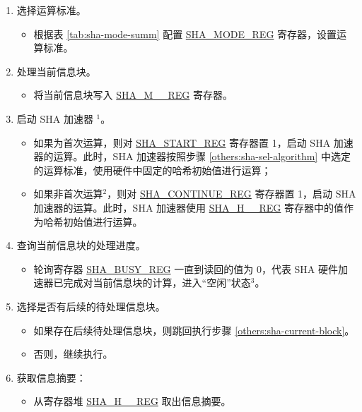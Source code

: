 \documentclass[main\_\_CN.tex]{subfiles}
\begin{document}
\begin{enumerate}
    \item \label{others:sha-sel-algorithm} 选择运算标准。
    \begin{itemize}
        \item 根据表 \ref{tab:sha-mode-summ} 配置 \hyperref[regdesc:SHAMODEREG]{SHA\_MODE\_REG} 寄存器，设置运算标准。
    \end{itemize}
    \item \label{others:sha-current-block} 处理当前信息块。
    \begin{itemize}
        \item 将当前信息块写入 \hyperref[regdesc:SHAMNREG]{SHA\_M\_\_REG} 寄存器。
    \end{itemize}
    \item 启动 SHA 加速器 \hyperref[others:sha-note-typical-sha]{$^1$}。
            \begin{itemize}
                \item 如果为首次运算，则对 \hyperref[regdesc:SHASTARTREG]{SHA\_START\_REG} 寄存器置 1，启动 SHA 加速器的运算。此时，SHA 加速器按照步骤 \ref{others:sha-sel-algorithm} 中选定的运算标准，使用硬件中固定的哈希初始值进行运算；
                \item 如果非首次运算\hyperref[others:sha-note-typical-sha]{$^2$}，则对 \hyperref[regdesc:SHACONTINUEREG]{SHA\_CONTINUE\_REG} 寄存器置 1，启动 SHA 加速器的运算。此时，SHA 加速器使用 \hyperref[regdesc:SHAHNREG]{SHA\_H\_\_REG} 寄存器中的值作为哈希初始值进行运算。
            \end{itemize}
    \item 查询当前信息块的处理进度。
    \begin{itemize}
        \item 轮询寄存器 \hyperref[regdesc:SHABUSYREG]{SHA\_BUSY\_REG} 一直到读回的值为 0，代表 SHA 硬件加速器已完成对当前信息块的计算，进入“空闲”状态\hyperref[others:sha-note-typical-sha]{$^3$}。
    \end{itemize}

    \item 选择是否有后续的待处理信息块。
    \begin{itemize}
        \item 如果存在后续待处理信息块，则跳回执行步骤 \ref{others:sha-current-block}。
        \item 否则，继续执行。
    \end{itemize}
    \item 获取信息摘要：
    \begin{itemize}
        \item 从寄存器堆 \hyperref[regdesc:SHAHNREG]{SHA\_H\_\_REG} 取出信息摘要。
    \end{itemize}
\end{enumerate}
\end{document}
